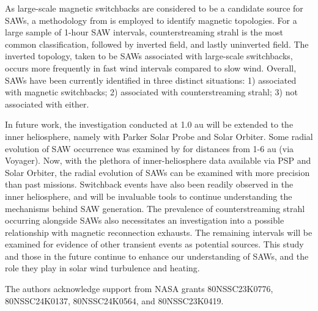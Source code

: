 \documentclass[twocolumn, times]{aastex631}
\begin{document}
As large-scale magnetic switchbacks are considered to be a candidate source for SAWs, a methodology from \cite{owens13} is employed to identify magnetic topologies. For a large sample of 1-hour SAW intervals, counterstreaming strahl is the most common classification, followed by inverted field, and lastly uninverted field. The inverted topology, taken to be SAWs associated with large-scale switchbacks, occurs more frequently in fast wind intervals compared to slow wind. Overall, SAWs have been currently identified in three distinct situations: 1) associated with magnetic switchbacks; 2) associated with counterstreaming strahl; 3) not associated with either.

In future work, the investigation conducted at 1.0 au will be extended to the inner heliosphere, namely with Parker Solar Probe and Solar Orbiter. Some radial evolution of SAW occurrence was examined by \cite{li2016} for distances from 1-6 au (via Voyager). Now, with the plethora of inner-heliosphere data available via PSP and Solar Orbiter, the radial evolution of SAWs can be examined with more precision than past missions. Switchback events have also been readily observed in the inner heliosphere, and will be invaluable tools to continue understanding the mechanisms behind SAW generation. The prevalence of counterstreaming strahl occurring alongside SAWs also necessitates an investigation into a possible relationship with magnetic reconnection exhausts. The remaining intervals will be examined for evidence of other transient events as potential sources. This study and those in the future continue to enhance our understanding of SAWs, and the role they play in solar wind turbulence and heating.

The authors acknowledge support from NASA grants 80NSSC23K0776, 80NSSC24K0137, 80NSSC24K0564, and 80NSSC23K0419.
\end{document}
